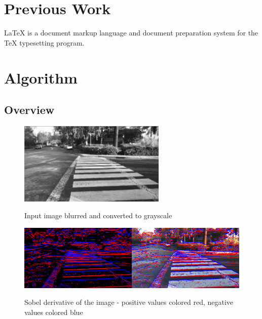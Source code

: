 \documentclass[12pt]{ucthesis}
\newcommand{\captionfonts}{\small\bf\ssp}
\begin{document}
\chapter{Previous Work}
\label{previous-work}

LaTeX is a document markup language and document preparation system for the TeX typesetting program.


\chapter{Algorithm}
\section{Overview}
\label{Overview}

\begin{figure}
\begin{center}
\includegraphics[width=7cm]{SlightlyBlurredInput.png}
\captionfonts
\caption[This is a figure]{Input image blurred and converted to grayscale}
\label{fig:SlightlyBlurred}
\end{center}
\end{figure}

\begin{figure}
\begin{center}
\includegraphics[width=14cm]{TopAndBottomSobel.png}
\captionfonts
\caption[This is a figure]{Sobel derivative of the image - positive values colored red, negative values colored blue}
\label{fig:TopAndBottomSobel}
\end{center}
\end{figure}
\end{document}
